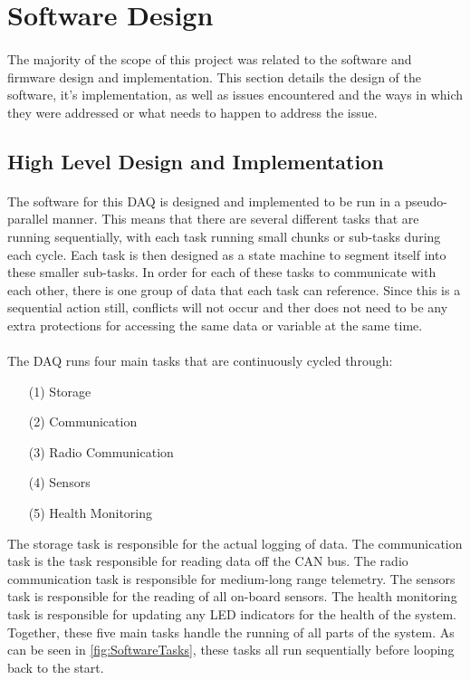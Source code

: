 \section{Software Design}

\paragraph{}
The majority of the scope of this project was related to the software and firmware design and implementation.
This section details the design of the software, it's implementation, as well as issues encountered and the ways in which they were addressed or what needs to happen to address the issue.

\subsection{High Level Design and Implementation}

\paragraph{}
The software for this DAQ is designed and implemented to be run in a pseudo-parallel manner.
This means that there are several different tasks that are running sequentially, with each task running small chunks or sub-tasks during each cycle.
Each task is then designed as a state machine to segment itself into these smaller sub-tasks.
In order for each of these tasks to communicate with each other, there is one group of data that each task can reference.
Since this is a sequential action still, conflicts will not occur and ther does not need to be any extra protections for accessing the same data or variable at the same time.

\paragraph{}
The DAQ runs four main tasks that are continuously cycled through:
\begin{itemize}
	\item[(1)] Storage
	\item[(2)] Communication
	\item[(3)] Radio Communication
	\item[(4)] Sensors
	\item[(5)] Health Monitoring
\end{itemize}
The storage task is responsible for the actual logging of data.
The communication task is the task responsible for reading data off the CAN bus.
The radio communication task is responsible for medium-long range telemetry.
The sensors task is responsible for the reading of all on-board sensors.
The health monitoring task is responsible for updating any LED indicators for the health of the system.
Together, these five main tasks handle the running of all parts of the system.
As can be seen in \cref{fig:SoftwareTasks}, these tasks all run sequentially before looping back to the start.

